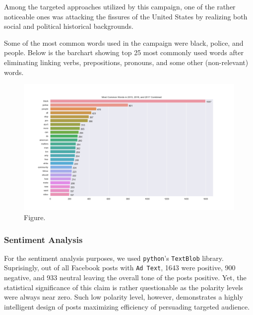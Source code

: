 \documentclass[12pt]{article}
\theoremstyle{definition}
\begin{document}
Among the targeted approaches utilized by this campaign, one of the rather
noticeable ones was attacking the fissures of the United States by realizing
both social and political historical backgrounds.

\bigskip

Some of the most common words used in the campaign were black, police, and
people. Below is the barchart showing top 25 most commonly used words after
eliminating linking verbs, prepositions, pronouns, and some other
(non-relevant) words.

\begin{figure}[H]
\centering
\includegraphics[width=\columnwidth]{./image/barchart-plots/barchart_word_counts.png}
\caption*{Figure.}
\end{figure}


\subsubsection*{\centering Sentiment Analysis}
For the sentiment analysis purposes, we used \texttt{python}'s \texttt{TextBlob}
library. Suprisingly, out of all Facebook posts with \texttt{Ad Text}, 1643 were
positive, 900 negative, and 933 neutral leaving the overall tone of the posts
positive. Yet, the statistical significance of this claim is rather questionable
as the polarity levels were always near zero. Such low polarity level, however,
demonstrates a highly intelligent design of posts maximizing efficiency of
persuading targeted audience.
\end{document}
